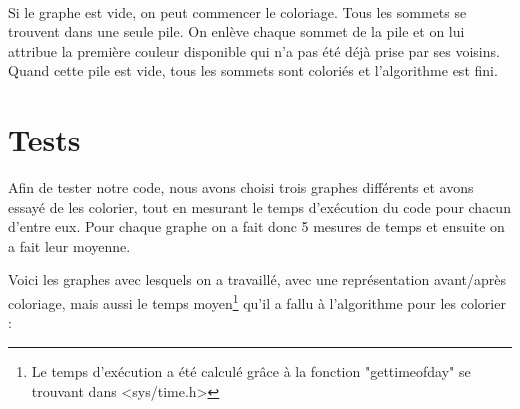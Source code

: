 \documentclass[a4paper, 11pt, oneside]{article}
\begin{document}
	\paragraph{}
	Si le graphe est vide, on peut commencer le coloriage. Tous les sommets se trouvent dans une seule pile. On enlève chaque sommet de la pile et on lui attribue la première couleur disponible qui n'a pas été déjà prise par ses voisins. Quand cette pile est vide, tous les sommets sont coloriés et l'algorithme est fini.

	\newpage
	\section{Tests}
	Afin de tester notre code, nous avons choisi trois graphes différents et avons essayé de les colorier, tout en mesurant le temps d'exécution du code pour chacun d'entre eux. Pour chaque graphe on a fait donc 5 mesures de temps et ensuite on a fait leur moyenne. \par
	Voici les graphes avec lesquels on a travaillé, avec une représentation avant/après coloriage, mais aussi le temps moyen\footnote{Le temps d'exécution a été calculé grâce à la fonction "gettimeofday" se trouvant dans <sys/time.h>} qu'il a fallu à l'algorithme pour les colorier : 
\end{document}
